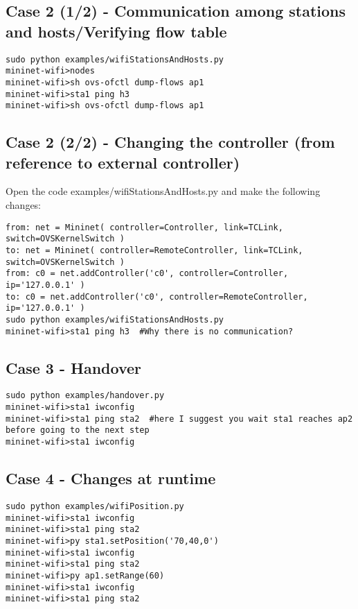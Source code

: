 \subsection{Case 2 (1/2) - Communication among stations and hosts/Verifying flow table}
\begin{verbatim}
sudo python examples/wifiStationsAndHosts.py  
mininet-wifi>nodes  
mininet-wifi>sh ovs-ofctl dump-flows ap1  
mininet-wifi>sta1 ping h3  
mininet-wifi>sh ovs-ofctl dump-flows ap1 
\end{verbatim}

\subsection{Case 2 (2/2) - Changing the controller (from reference to external controller)}

Open the code examples/wifiStationsAndHosts.py and make the following changes:

\begin{verbatim}
from: net = Mininet( controller=Controller, link=TCLink, switch=OVSKernelSwitch )  
to: net = Mininet( controller=RemoteController, link=TCLink, switch=OVSKernelSwitch )  
from: c0 = net.addController('c0', controller=Controller, ip='127.0.0.1' )  
to: c0 = net.addController('c0', controller=RemoteController, ip='127.0.0.1' )  
sudo python examples/wifiStationsAndHosts.py  
mininet-wifi>sta1 ping h3  #Why there is no communication? 
\end{verbatim}
  
\subsection{Case 3 - Handover}
\begin{verbatim}
sudo python examples/handover.py  
mininet-wifi>sta1 iwconfig  
mininet-wifi>sta1 ping sta2  #here I suggest you wait sta1 reaches ap2 before going to the next step
mininet-wifi>sta1 iwconfig  
\end{verbatim}
 
\subsection{Case 4 - Changes at runtime}
\begin{verbatim}
sudo python examples/wifiPosition.py  
mininet-wifi>sta1 iwconfig   
mininet-wifi>sta1 ping sta2  
mininet-wifi>py sta1.setPosition('70,40,0')  
mininet-wifi>sta1 iwconfig  
mininet-wifi>sta1 ping sta2  
mininet-wifi>py ap1.setRange(60)  
mininet-wifi>sta1 iwconfig  
mininet-wifi>sta1 ping sta2  
\end{verbatim}

